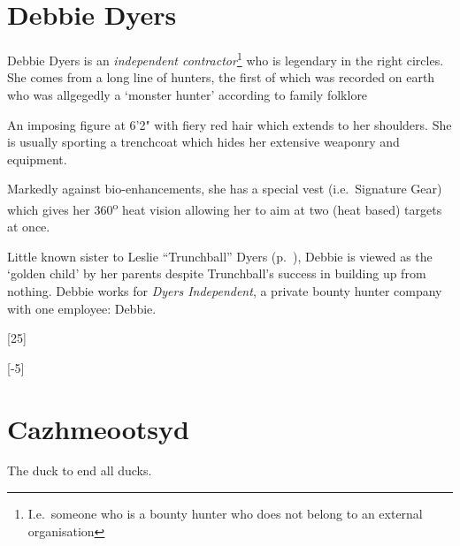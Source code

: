 \begin{character}
     

\end{character}

\section{Debbie Dyers}
\label{sec:debbie-dyers}

Debbie Dyers is an \emph{independent contractor}\footnote{I.e.~someone who is a
  bounty hunter who does not belong to an external organisation} who is
legendary in the right circles. She comes from a long line of hunters, the first
of which was recorded on earth who was allgegedly a `monster hunter' according
to family folklore

An imposing figure at 6'2" with fiery red hair which extends to her shoulders.
She is usually sporting a trenchcoat which hides her extensive weaponry and
equipment.

Markedly against bio-enhancements, she has a special vest (i.e.~Signature Gear)
which gives her 360\textsuperscript{o} heat vision allowing her to aim at
two (heat based) targets at once.

Little known sister to Leslie ``Trunchball'' Dyers
(p.~\pageref{sec:lesl-trunchb-dyers}), Debbie is viewed as the `golden child' by her
parents despite Trunchball's success in building \thecompany up from nothing.
Debbie works for \emph{Dyers Independent}, a private bounty hunter company with
one employee: Debbie.

\begin{character}
     


  [25]

  [-5]

\end{character}


\section{Cazhmeootsyd}
\label{sec:cazhmeootsyd}

The duck to end all ducks.

